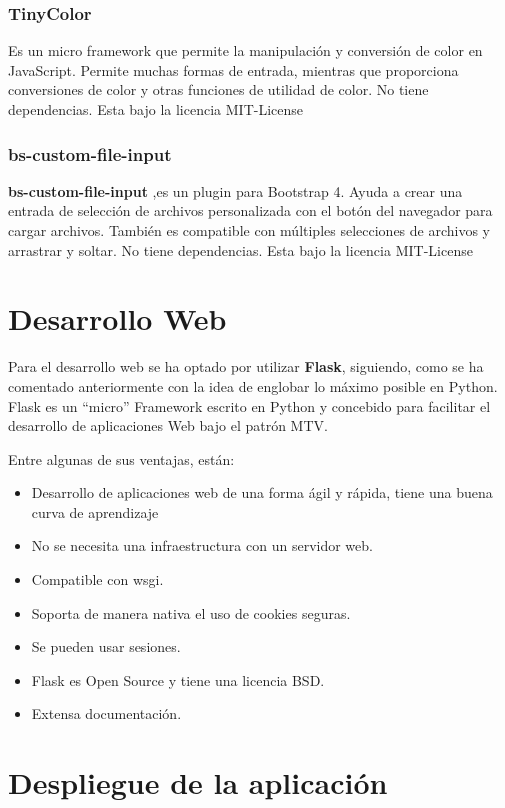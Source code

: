 \subsubsection{TinyColor}

Es un micro framework que permite la manipulación y conversión de color en JavaScript. Permite muchas formas de entrada, mientras que proporciona conversiones de color y otras funciones de utilidad de color. No tiene dependencias. Esta bajo la licencia MIT-License


\subsubsection{bs-custom-file-input}

\textbf{bs-custom-file-input} ,es un plugin para Bootstrap 4. Ayuda a crear una entrada de selección de archivos personalizada con el botón del navegador para cargar archivos. También es compatible con múltiples selecciones de archivos y arrastrar y soltar.
No tiene dependencias. Esta bajo la licencia MIT-License

\section{Desarrollo Web}

Para el desarrollo web se ha optado por utilizar \textbf{Flask}, siguiendo, como se ha comentado anteriormente con la idea de englobar lo máximo posible en Python.
Flask es un “micro” Framework escrito en Python y concebido para facilitar el desarrollo de aplicaciones Web bajo el patrón MTV.

Entre algunas de sus ventajas, están:
\begin{itemize}
\item Desarrollo de aplicaciones web de una forma ágil y rápida, tiene una buena curva de aprendizaje
\item No se necesita una infraestructura con un servidor web.
\item Compatible con wsgi.
\item Soporta de manera nativa el uso de cookies seguras.
\item Se pueden usar sesiones.
\item Flask es Open Source y tiene una licencia BSD.
\item Extensa documentación.
\end{itemize}

\section{Despliegue de la aplicación}

